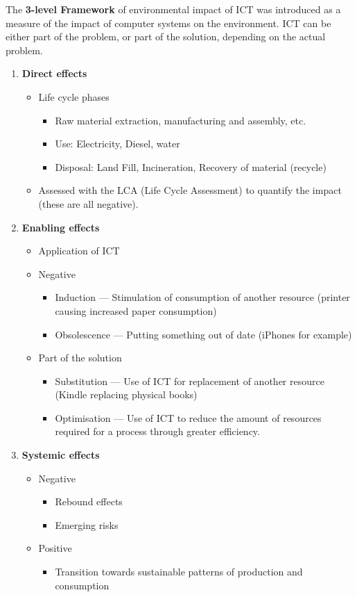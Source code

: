 \documentclass[11pt,a4paper,titlepage,dvipsnames,cmyk]{scrartcl}
\begin{document}
The \textbf{3-level Framework} of environmental impact of ICT was introduced as a measure of the impact of computer systems on the environment. ICT can be either part of the problem, or part of the solution, depending on the actual problem.
\begin{enumerate}
    \item \textbf{Direct effects}
    \begin{itemize}
        \item Life cycle phases
        \begin{itemize}
            \item Raw material extraction, manufacturing and assembly, etc.
            \item Use: Electricity, Diesel, water
            \item Disposal: Land Fill, Incineration, Recovery of material (recycle)
        \end{itemize}
        \item Assessed with the LCA (Life Cycle Assessment) to quantify the impact (these are all negative).
    \end{itemize}
    \item \textbf{Enabling effects}
    \begin{itemize}
        \item Application of ICT
        \item Negative
        \begin{itemize}
            \item Induction --- Stimulation of consumption of another resource (printer causing increased paper consumption)
            \item Obsolescence --- Putting something out of date (iPhones for example)
        \end{itemize}
        \item Part of the solution
        \begin{itemize}
            \item Substitution --- Use of ICT for replacement of another resource (Kindle replacing physical books)
            \item Optimisation --- Use of ICT to reduce the amount of resources required for a process through greater efficiency.
        \end{itemize}
    \end{itemize}
    \item \textbf{Systemic effects}
    \begin{itemize}
        \item Negative
        \begin{itemize}
            \item Rebound effects
            \item Emerging risks
        \end{itemize}
        \item Positive
        \begin{itemize}
            \item Transition towards sustainable patterns of production and consumption
        \end{itemize}
    \end{itemize}
\end{enumerate}
\end{document}
